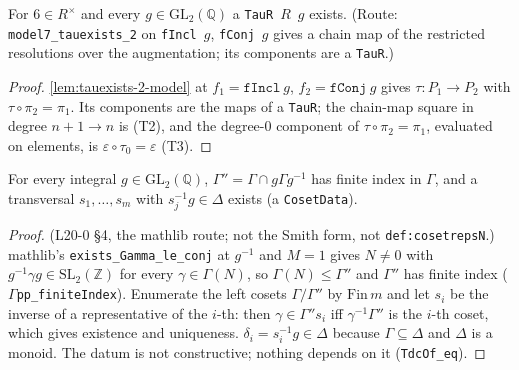 \begin{lemma}\label{lem:m4-tauR-exists}
  \leanok
  For $6\in R^\times$ and every $g\in\mathrm{GL}_2(\mathbb Q)$ a \texttt{TauR}~$R$~$g$ exists. (Route: \texttt{model7\_tauexists\_2} on
  \texttt{fIncl}~$g$, \texttt{fConj}~$g$ gives a chain map of the restricted resolutions over the augmentation; its components
  are a \texttt{TauR}.)
\end{lemma}
\begin{proof}
  \leanok
  \ref{lem:tauexists-2-model} at $f_1=\texttt{fIncl}~g$, $f_2=\texttt{fConj}~g$ gives $\tau\colon P_1\to P_2$ with
  $\tau\circ\pi_2=\pi_1$. Its components are the maps of a \texttt{TauR}; the chain-map square in degree $n+1\to n$ is (T2), and the
  degree-$0$ component of $\tau\circ\pi_2=\pi_1$, evaluated on elements, is $\varepsilon\circ\tau_0=\varepsilon$ (T3).
\end{proof}

\begin{lemma}\label{lem:m4-cosetdata}
  \leanok
  For every integral $g\in\mathrm{GL}_2(\mathbb Q)$, $\Gamma''=\Gamma\cap g\Gamma g^{-1}$ has finite index in $\Gamma$, and a
  transversal $s_1,\dots,s_m$ with $s_j^{-1}g\in\Delta$ exists (a \texttt{CosetData}).
\end{lemma}
\begin{proof}
  \leanok
  (L20-0 §4, the mathlib route; not the Smith form, not \texttt{def:cosetrepsN}.) mathlib's \texttt{exists\_Gamma\_le\_conj} at
  $g^{-1}$ and $M=1$ gives $N\neq0$ with $g^{-1}\gamma g\in\mathrm{SL}_2(\mathbb Z)$ for every $\gamma\in\Gamma(N)$, so
  $\Gamma(N)\le\Gamma''$ and $\Gamma''$ has finite index (\texttt{$\Gamma$pp\_finiteIndex}). Enumerate the left cosets $\Gamma/\Gamma''$ by
  $\mathrm{Fin}\,m$ and let $s_i$ be the inverse of a representative of the $i$-th: then $\gamma\in\Gamma''s_i$ iff
  $\gamma^{-1}\Gamma''$ is the $i$-th coset, which gives existence and uniqueness. $\delta_i=s_i^{-1}g\in\Delta$ because
  $\Gamma\subseteq\Delta$ and $\Delta$ is a monoid. The datum is not constructive; nothing depends on it (\texttt{TdcOf\_eq}).
\end{proof}

